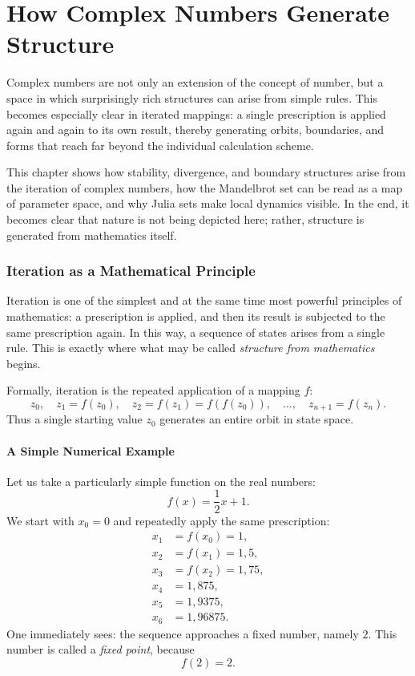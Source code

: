 \chapter{How Complex Numbers Generate Structure}
\label{chap:VII_complex_structure}

Complex numbers are not only an extension of the concept of number,
but a space in which surprisingly rich structures can arise from simple rules.
This becomes especially clear in iterated mappings:
a single prescription is applied again and again to its own result,
thereby generating orbits, boundaries, and forms
that reach far beyond the individual calculation scheme.

This chapter shows
how stability, divergence, and boundary structures arise
from the iteration of complex numbers,
how the Mandelbrot set can be read as a map of parameter space,
and why Julia sets make local dynamics visible.
In the end, it becomes clear
that nature is not being depicted here;
rather, structure is generated from mathematics itself.


\subsection{Iteration as a Mathematical Principle}


Iteration is one of the simplest and at the same time most powerful principles of mathematics:
a prescription is applied, and then its result is subjected to the same prescription again.
In this way, a sequence of states arises from a single rule.
This is exactly where what may be called \emph{structure from mathematics} begins.

Formally, iteration is the repeated application of a mapping $f$:
\[
z_0,\quad z_1=f(z_0),\quad z_2=f(z_1)=f(f(z_0)),\quad \ldots,\quad z_{n+1}=f(z_n).
\]
Thus a single starting value $z_0$ generates an entire orbit in state space.

\subsubsection*{A Simple Numerical Example}

Let us take a particularly simple function on the real numbers:
\[
f(x)=\frac12 x + 1.
\]
We start with $x_0=0$ and repeatedly apply the same prescription:
\[
\begin{aligned}
	x_1 &= f(x_0)=1,\\
	x_2 &= f(x_1)=1{,}5,\\
	x_3 &= f(x_2)=1{,}75,\\
	x_4 &= 1{,}875,\\
	x_5 &= 1{,}9375,\\
	x_6 &= 1{,}96875.
\end{aligned}
\]
One immediately sees:
the sequence approaches a fixed number, namely $2$.
This number is called a \emph{fixed point}, because
\[
f(2)=2.
\]

